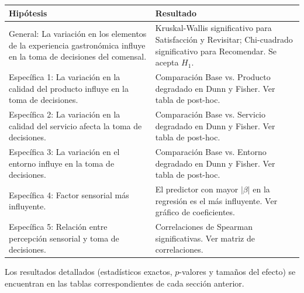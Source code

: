 \documentclass[
  spanish,
]{article}
\begin{document}
\begin{tabu} to 
\toprule
Hipótesis & Resultado\\
\midrule
General: La variación en los elementos de la experiencia gastronómica influye en la toma de decisiones del comensal. & Kruskal-Wallis significativo para Satisfacción y Revisitar; Chi-cuadrado significativo para Recomendar. Se acepta $H_1$.\\
Específica 1: La variación en la calidad del producto influye en la toma de decisiones. & Comparación Base vs. Producto degradado en Dunn y Fisher. Ver tabla de post-hoc.\\
Específica 2: La variación en la calidad del servicio afecta la toma de decisiones. & Comparación Base vs. Servicio degradado en Dunn y Fisher. Ver tabla de post-hoc.\\
Específica 3: La variación en el entorno influye en la toma de decisiones. & Comparación Base vs. Entorno degradado en Dunn y Fisher. Ver tabla de post-hoc.\\
Específica 4: Factor sensorial más influyente. & El predictor con mayor $|\beta|$ en la regresión es el más influyente. Ver gráfico de coeficientes.\\
\addlinespace
Específica 5: Relación entre percepción sensorial y toma de decisiones. & Correlaciones de Spearman significativas. Ver matriz de correlaciones.\\
\bottomrule
\end{tabu}
\endgroup{}

Los resultados detallados (estadísticos exactos, \(p\)-valores y tamaños
del efecto) se encuentran en las tablas correspondientes de cada sección
anterior.
\end{document}
